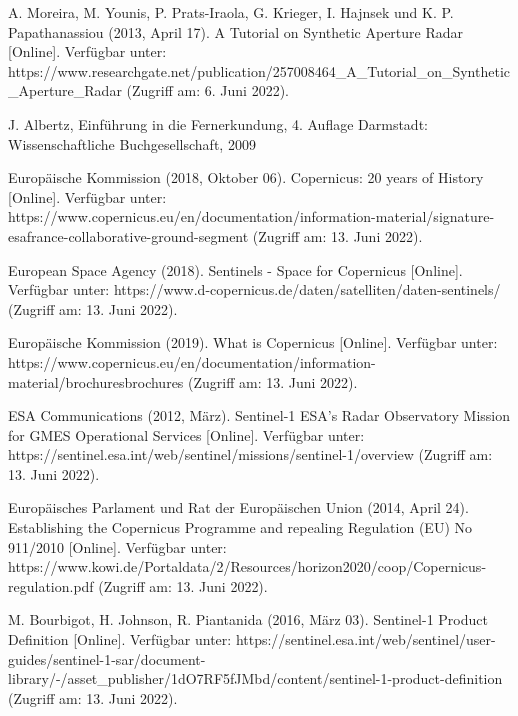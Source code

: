 \newpage
\thispagestyle{empty}
\begin{thebibliography}{1}

A. Moreira, M. Younis, P. Prats-Iraola, G. Krieger, I. Hajnsek und K. P. Papathanassiou (2013, April 17). A Tutorial on Synthetic Aperture Radar [Online]. Verfügbar unter: 
https://www.researchgate.net/publication/257008464\_A\_Tutorial\_on\_Synthetic\_Aperture\_Radar
(Zugriff am: 6. Juni 2022).

J. Albertz, Einführung in die Fernerkundung, 4. Auflage Darmstadt: Wissenschaftliche Buchgesellschaft, 2009

Europäische Kommission (2018, Oktober 06). Copernicus: 20 years of History [Online]. Verfügbar unter: 
https://www.copernicus.eu/en/documentation/information-material/signature-esafrance-collaborative-ground-segment
(Zugriff am: 13. Juni 2022).

European Space Agency (2018). Sentinels - Space for Copernicus [Online]. Verfügbar unter: 
https://www.d-copernicus.de/daten/satelliten/daten-sentinels/
(Zugriff am: 13. Juni 2022).

Europäische Kommission (2019). What is Copernicus [Online]. Verfügbar unter: 
https://www.copernicus.eu/en/documentation/information-material/brochuresbrochures
(Zugriff am: 13. Juni 2022).

ESA Communications (2012, März). Sentinel-1 ESA's Radar Observatory Mission for GMES Operational Services [Online]. Verfügbar unter: 
https://sentinel.esa.int/web/sentinel/missions/sentinel-1/overview
(Zugriff am: 13. Juni 2022).

Europäisches Parlament und Rat der Europäischen Union (2014, April 24). Establishing the Copernicus Programme and repealing Regulation (EU) No 911/2010 [Online]. Verfügbar unter: 
https://www.kowi.de/Portaldata/2/Resources/horizon2020/coop/Copernicus-regulation.pdf
(Zugriff am: 13. Juni 2022).

M. Bourbigot, H. Johnson, R. Piantanida (2016, März 03). Sentinel-1 Product Definition [Online]. Verfügbar unter: 
https://sentinel.esa.int/web/sentinel/user-guides/sentinel-1-sar/document-library/-/asset\_publisher/1dO7RF5fJMbd/content/sentinel-1-product-definition
(Zugriff am: 13. Juni 2022).

\end{thebibliography}